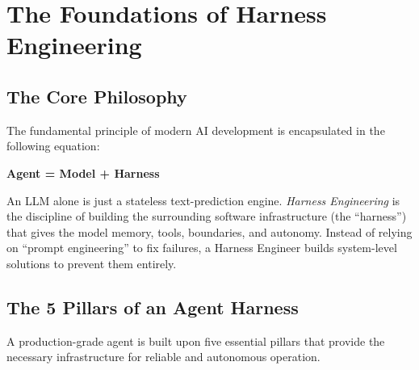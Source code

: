 \chapter{The Foundations of Harness Engineering}

\section{The Core Philosophy}
The fundamental principle of modern AI development is encapsulated in the following equation:
\begin{center}
    \textbf{Agent = Model + Harness}
\end{center}

An LLM alone is just a stateless text-prediction engine. \textit{Harness Engineering} is the discipline of building the surrounding software infrastructure (the ``harness'') that gives the model memory, tools, boundaries, and autonomy. Instead of relying on ``prompt engineering'' to fix failures, a Harness Engineer builds system-level solutions to prevent them entirely.

\section{The 5 Pillars of an Agent Harness}

A production-grade agent is built upon five essential pillars that provide the necessary infrastructure for reliable and autonomous operation.

